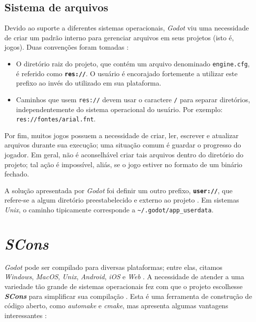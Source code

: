 
\subsection{Sistema de arquivos}
\label{godotFileSystem}

Devido ao suporte a diferentes sistemas operacionais, \textit{Godot} viu uma necessidade de criar um padrão interno para gerenciar arquivos em seus projetos (isto é, jogos). Duas convenções foram tomadas \citep{godotFileSystem}:

\begin{itemize}
\item O diretório raiz do projeto, que contém um arquivo denominado \texttt{engine.cfg}, é referido como \textbf{\texttt{res://}}. O usuário é encorajado fortemente a utilizar este prefixo ao invés do utilizado em sua plataforma.

\item Caminhos que usem \texttt{res://} devem usar o caractere \texttt{/} para separar diretórios, independentemente do sistema operacional do usuário. Por exemplo: \texttt{res://fontes/arial.fnt}.
\end{itemize}

Por fim, muitos jogos possuem a necessidade de criar, ler, escrever e atualizar arquivos durante sua execução; uma situação comum é guardar o progresso do jogador. Em geral, não é aconselhável criar tais arquivos dentro do diretório do projeto; tal ação é impossível, aliás, se o jogo estiver no formato de um binário fechado.

A solução apresentada por \textit{Godot} foi definir um outro prefixo, \textbf{\texttt{user://}}, que refere-se a algum diretório preestabelecido e externo ao projeto \citep{godotFileSystem}. Em sistemas \textit{Unix}, o caminho tipicamente corresponde a \texttt{\textasciitilde/.godot/app\_userdata}.


\section{\textit{SCons}}
\label{scons}

\textit{Godot} pode ser compilado para diversas plataformas; entre elas, citamos \textit{Windows}, \textit{MacOS}, \textit{Unix}, \textit{Android}, \textit{iOS} e \textit{Web} \citep{godotDeployPlatforms}. A necessidade de atender a uma variedade tão grande de sistemas operacionais fez com que o projeto escolhesse \textbf{\textit{SCons}} para simplificar sua compilação \citep{godotScons}. Esta é uma ferramenta de construção de código aberto, como \textit{automake} e \textit{cmake}, mas apresenta algumas vantagens interessantes \citep{scons}:

